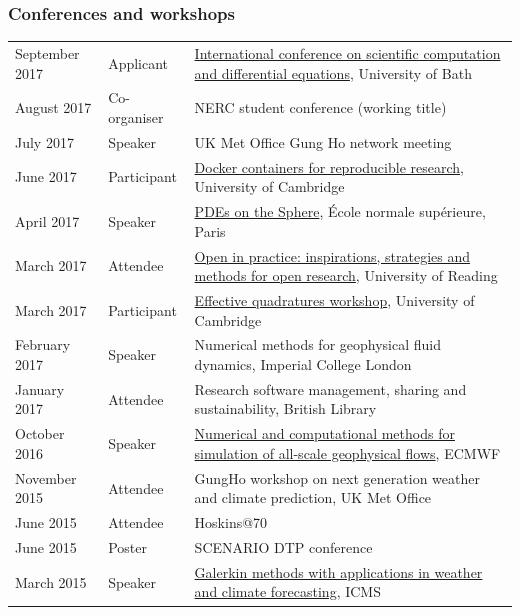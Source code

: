 \documentclass[a4paper,11pt]{article}
\begin{document}
\subsubsection*{Conferences and workshops}
\begin{tabularx}{\linewidth}{l l X}
September 2017 & Applicant & \href{https://sites.google.com/site/scicade2017/}{International conference on scientific computation and differential equations}, University of Bath \\
August 2017 & Co-organiser & NERC student conference (working title) \\
July 2017 & Speaker & UK Met Office Gung Ho network meeting \\
June 2017 & Participant & \href{https://www.software.ac.uk/c4rr}{Docker containers for reproducible research}, University of Cambridge \\
April 2017 & Speaker & \href{https://forge.ipsl.jussieu.fr/heat/wiki/PDEs2017}{PDEs on the Sphere}, École normale supérieure, Paris \\
March 2017 & Attendee & \href{https://blogs.reading.ac.uk/open-research/open-in-practice-inspirations-strategies-and-methods-for-open-research/}{Open in practice: inspirations, strategies and methods for open research}, University of Reading \\
March 2017 & Participant & \href{http://www.effective-quadratures.org/eq2017}{Effective quadratures workshop}, University of Cambridge \\
February 2017 & Speaker & Numerical methods for geophysical fluid dynamics, Imperial College London \\
January 2017 & Attendee & Research software management, sharing and sustainability, British Library \\
October 2016 & Speaker & \href{http://www.ecmwf.int/en/learning/workshops-and-seminars/workshop-numerical-and-computational-methods-simulation-all-scale-geophysical-flows}{Numerical and computational methods for simulation of all-scale geophysical flows}, ECMWF \\
November 2015 & Attendee & GungHo workshop on next generation weather and climate prediction, UK Met Office \\
June 2015 & Attendee & Hoskins@70 \\
June 2015 & Poster & SCENARIO DTP conference \\
March 2015 & Speaker & \href{http://www.icms.org.uk/workshop.php?id=334}{Galerkin methods with applications in weather and climate forecasting}, ICMS \\
\end{tabularx}
\end{document}
